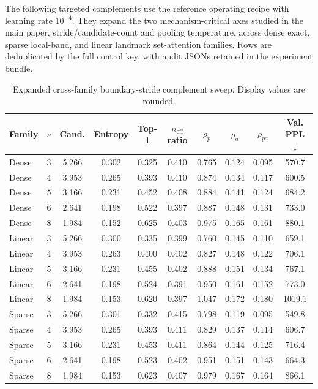 \documentclass{article}
\theoremstyle{plain}
\theoremstyle{definition}
\theoremstyle{remark}
\begin{document}
The following targeted complements use the reference operating recipe with learning rate $10^{-4}$. They expand the two mechanism-critical axes studied in the main paper, stride/candidate-count and pooling temperature, across dense exact, sparse local-band, and linear landmark set-attention families. Rows are deduplicated by the full control key, with audit JSONs retained in the experiment bundle.

\begin{table}[t]
\centering
\caption{Expanded cross-family boundary-stride complement sweep. Display values are rounded.}
\label{tab:boundary-family-complements}
\small
\begin{tabular}{lccccccccc}
\toprule
Family & $s$ & Cand. & Entropy & Top-1 & $n_{\mathrm{eff}}$ ratio & $\rho_p$ & $\rho_a$ & $\rho_{pa}$ & Val. PPL $\downarrow$ \\
\midrule
Dense & 3 & 5.266 & 0.302 & 0.325 & 0.410 & 0.765 & 0.124 & 0.095 & 570.7 \\
Dense & 4 & 3.953 & 0.265 & 0.393 & 0.410 & 0.874 & 0.134 & 0.117 & 600.5 \\
Dense & 5 & 3.166 & 0.231 & 0.452 & 0.408 & 0.884 & 0.141 & 0.124 & 684.2 \\
Dense & 6 & 2.641 & 0.198 & 0.522 & 0.397 & 0.887 & 0.148 & 0.131 & 733.0 \\
Dense & 8 & 1.984 & 0.152 & 0.625 & 0.403 & 0.975 & 0.165 & 0.161 & 880.1 \\
Linear & 3 & 5.266 & 0.300 & 0.335 & 0.399 & 0.760 & 0.145 & 0.110 & 659.1 \\
Linear & 4 & 3.953 & 0.263 & 0.400 & 0.402 & 0.827 & 0.148 & 0.122 & 706.1 \\
Linear & 5 & 3.166 & 0.231 & 0.455 & 0.402 & 0.888 & 0.151 & 0.134 & 767.1 \\
Linear & 6 & 2.641 & 0.198 & 0.524 & 0.391 & 0.950 & 0.161 & 0.152 & 773.0 \\
Linear & 8 & 1.984 & 0.153 & 0.620 & 0.397 & 1.047 & 0.172 & 0.180 & 1019.1 \\
Sparse & 3 & 5.266 & 0.301 & 0.332 & 0.415 & 0.798 & 0.119 & 0.095 & 549.8 \\
Sparse & 4 & 3.953 & 0.265 & 0.393 & 0.411 & 0.829 & 0.137 & 0.114 & 606.7 \\
Sparse & 5 & 3.166 & 0.231 & 0.453 & 0.411 & 0.864 & 0.144 & 0.125 & 716.4 \\
Sparse & 6 & 2.641 & 0.198 & 0.523 & 0.402 & 0.951 & 0.151 & 0.143 & 664.3 \\
Sparse & 8 & 1.984 & 0.153 & 0.623 & 0.407 & 0.979 & 0.167 & 0.164 & 866.1 \\
\bottomrule
\end{tabular}
\end{table}
\end{document}
